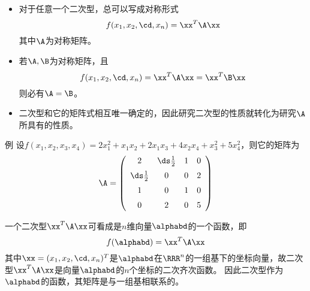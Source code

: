 \begin{frame}
  \begin{footnotesize}
    \begin{itemize}
    \item
      对于任意一个二次型，总可以写成对称形式
      $$
      f(x_1,x_2,\cd,x_n)=\xx^T\A\xx
      $$
      其中$\A$为对称矩阵。\\[0.1in]\pause
    \item
      若$\A,\B$为对称矩阵，且
      $$
      f(x_1,x_2,\cd,x_n)=\xx^T\A\xx=\xx^T\B\xx
      $$
      则必有$\A=\B$。\\[0.1in]\pause
    \item 二次型和它的矩阵式相互唯一确定的，因此研究二次型的性质就转化为研究$\A$所具有的性质。
    \end{itemize}

  \end{footnotesize}
\end{frame}

\begin{frame}
  \begin{footnotesize}
    \begin{exampleblock}{例}
      设$f(x_1,x_2,x_3,x_4)=2x_1^2+x_1x_2+2x_1x_3+4x_2x_4+x_3^2+5x_4^2$，则它的矩阵为
      $$
      \A=\left(
      \begin{array}{cccc}
        2&\ds\frac12&1&0\\[0.2cm]
        \ds\frac12&0&0&2\\[0.2cm]
        1&0&1&0\\[0.2cm]
        0&2&0&5
      \end{array}
      \right)
      $$
    \end{exampleblock}
  \end{footnotesize}
\end{frame}

\begin{frame}
  \begin{footnotesize}
    一个二次型$\xx^T\A\xx$可看成是$n$维向量$\alphabd$的一个函数，即
    $$
    f(\alphabd)=\xx^T\A\xx
    $$
    其中$\xx=(x_1,x_2,\cd,x_n)^T$是$\alphabd$在$\RRR^n$的一组基下的坐标向量，故二次型$\xx^T\A\xx$是向量$\alphabd$的$n$个坐标的二次齐次函数。
    因此二次型作为$\alphabd$的函数，其矩阵是与一组基相联系的。
  \end{footnotesize}
\end{frame}

